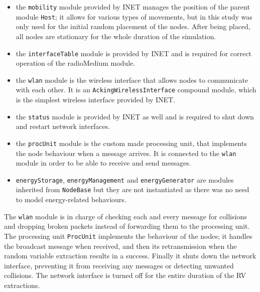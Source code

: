 \begin{itemize}
    \item the \texttt{mobility} module provided by INET manages the position of
    the parent module \texttt{Host}; it allows for various types of movements, but
    in this study was only used for the initial random placement of the
    nodes. After being placed, all nodes are stationary for the whole duration
	of the simulation.
    \item the \texttt{interfaceTable} module is provided by INET and is required
    for correct operation of the radioMedium module.
    \item the \texttt{wlan} module is the wireless interface that allows nodes
    to communicate with each other. It is an \texttt{AckingWirelessInterface}
    compound module, which is the simplest wireless interface provided by INET.
    \item the \texttt{status} module is provided by INET as well and is required
    to shut down and restart network interfaces.
    \item the \texttt{procUnit} module is the custom made processing unit, that
    implements the node behaviour when a message arrives. It is connected to the
    \texttt{wlan} module in order to be able to receive and send messages.
    \item \texttt{energyStorage}, \texttt{energyManagement} and
    \texttt{energyGenerator} are modules inherited from \texttt{NodeBase} but
    they are not instantiated as there was no need to model energy-related
    behaviours.
\end{itemize}
The \texttt{wlan} module is in charge of checking each and every message for
collisions and dropping broken packets instead of forwarding them to the processing
unit. The processing unit \texttt{ProcUnit} implements the behaviour of the
nodes; it handles the broadcast message when received, and then its
retransmission when the random variable extraction results in a success. Finally
it shuts down the network interface, preventing it from receiving any messages
or detecting unwanted collisions. The network interface is turned off for the entire
duration of the RV extractions.
